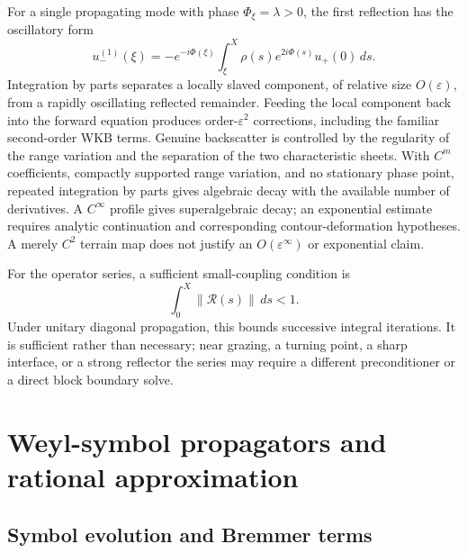 \documentclass[11pt]{article}
\newcommand{\Rop}{\mathcal R}
\newcommand{\eps}{\varepsilon}
\begin{document}
For a single propagating mode with phase $\Phi_\xi=\lambda>0$, the first
reflection has the oscillatory form
\begin{equation}\label{eq:oscillatory}
  u_-^{(1)}(\xi)=-e^{-i\Phi(\xi)}
  \int_\xi^X \rho(s)e^{2i\Phi(s)}u_+(0)\,ds.
\end{equation}
Integration by parts separates a locally slaved component, of relative size
$O(\eps)$, from a rapidly oscillating reflected remainder. Feeding the local
component back into the forward equation produces order-$\eps^2$ corrections,
including the familiar second-order WKB terms. Genuine backscatter is
controlled by the regularity of the range variation and the separation of
the two characteristic sheets. With $C^m$ coefficients, compactly supported
range variation, and no stationary phase point, repeated integration by parts
gives algebraic decay with the available number of derivatives. A
$C^\infty$ profile gives superalgebraic decay; an exponential estimate
requires analytic continuation and corresponding contour-deformation
hypotheses. A merely $C^2$ terrain map does not justify an
$O(\eps^\infty)$ or exponential claim.

For the operator series, a sufficient small-coupling condition is
\begin{equation}\label{eq:smallcoupling}
  \int_0^X\|\Rop(s)\|\,ds<1.
\end{equation}
Under unitary diagonal propagation, this bounds successive integral
iterations. It is sufficient rather than necessary; near grazing, a turning
point, a sharp interface, or a strong reflector the series may require a
different preconditioner or a direct block boundary solve.

\section{Weyl-symbol propagators and rational approximation}

\subsection{Symbol evolution and Bremmer terms}
\end{document}
